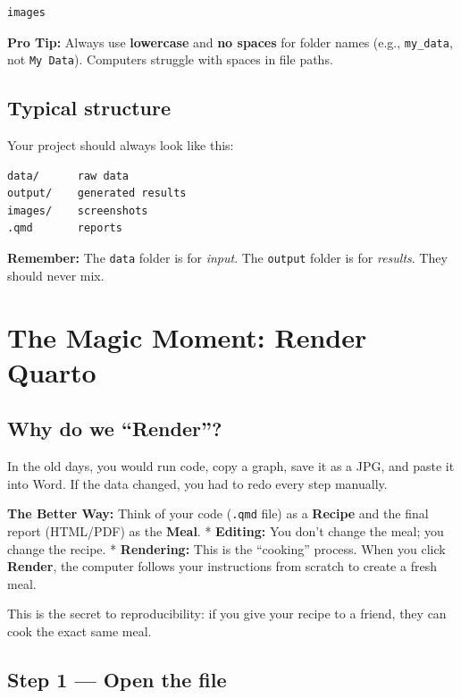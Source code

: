 \documentclass[
  letterpaper,
  DIV=11,
  numbers=noendperiod,
  oneside]{scrreprt}
\begin{document}
\begin{verbatim}
images
\end{verbatim}

\textbf{Pro Tip:} Always use \textbf{lowercase} and \textbf{no spaces}
for folder names (e.g., \texttt{my\_data}, not \texttt{My\ Data}).
Computers struggle with spaces in file paths.

\section{Typical structure}\label{typical-structure}

Your project should always look like this:

\begin{verbatim}
data/      raw data  
output/    generated results  
images/    screenshots  
.qmd       reports  
\end{verbatim}

\textbf{Remember:} The \texttt{data} folder is for \emph{input}. The
\texttt{output} folder is for \emph{results}. They should never mix.

\chapter{The Magic Moment: Render
Quarto}\label{the-magic-moment-render-quarto}

\section{Why do we ``Render''?}\label{why-do-we-render}

In the old days, you would run code, copy a graph, save it as a JPG, and
paste it into Word. If the data changed, you had to redo every step
manually.

\textbf{The Better Way:} Think of your code (\texttt{.qmd} file) as a
\textbf{Recipe} and the final report (HTML/PDF) as the \textbf{Meal}. *
\textbf{Editing:} You don't change the meal; you change the recipe. *
\textbf{Rendering:} This is the ``cooking'' process. When you click
\textbf{Render}, the computer follows your instructions from scratch to
create a fresh meal.

This is the secret to reproducibility: if you give your recipe to a
friend, they can cook the exact same meal.

\section{Step 1 --- Open the file}\label{step-1-open-the-file}
\end{document}
